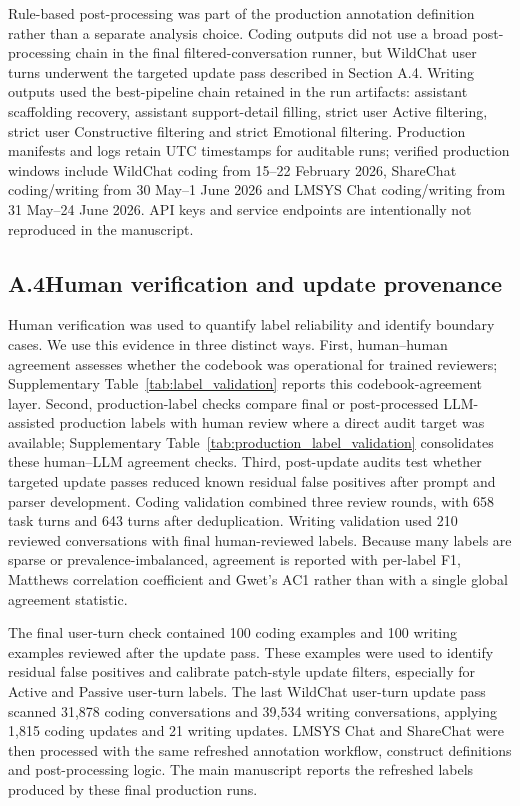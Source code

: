 Rule-based post-processing was part of the production annotation definition rather than a separate analysis choice. Coding outputs did not use a broad post-processing chain in the final filtered-conversation runner, but WildChat user turns underwent the targeted update pass described in Section A.4. Writing outputs used the best-pipeline chain retained in the run artifacts: assistant scaffolding recovery, assistant support-detail filling, strict user Active filtering, strict user Constructive filtering and strict Emotional filtering. Production manifests and logs retain UTC timestamps for auditable runs; verified production windows include WildChat coding from 15--22 February 2026, ShareChat coding/writing from 30 May--1 June 2026 and LMSYS Chat coding/writing from 31 May--24 June 2026. API keys and service endpoints are intentionally not reproduced in the manuscript.

\subsection*{A.4\quad Human verification and update provenance}

Human verification was used to quantify label reliability and identify boundary cases. We use this evidence in three distinct ways. First, human--human agreement assesses whether the codebook was operational for trained reviewers; Supplementary Table~\ref{tab:label_validation} reports this codebook-agreement layer. Second, production-label checks compare final or post-processed LLM-assisted production labels with human review where a direct audit target was available; Supplementary Table~\ref{tab:production_label_validation} consolidates these human--LLM agreement checks. Third, post-update audits test whether targeted update passes reduced known residual false positives after prompt and parser development. Coding validation combined three review rounds, with 658 task turns and 643 turns after deduplication. Writing validation used 210 reviewed conversations with final human-reviewed labels. Because many labels are sparse or prevalence-imbalanced, agreement is reported with per-label F1, Matthews correlation coefficient and Gwet's AC1 rather than with a single global agreement statistic.

The final user-turn check contained 100 coding examples and 100 writing examples reviewed after the update pass. These examples were used to identify residual false positives and calibrate patch-style update filters, especially for Active and Passive user-turn labels. The last WildChat user-turn update pass scanned 31,878 coding conversations and 39,534 writing conversations, applying 1,815 coding updates and 21 writing updates. LMSYS Chat and ShareChat were then processed with the same refreshed annotation workflow, construct definitions and post-processing logic. The main manuscript reports the refreshed labels produced by these final production runs.

